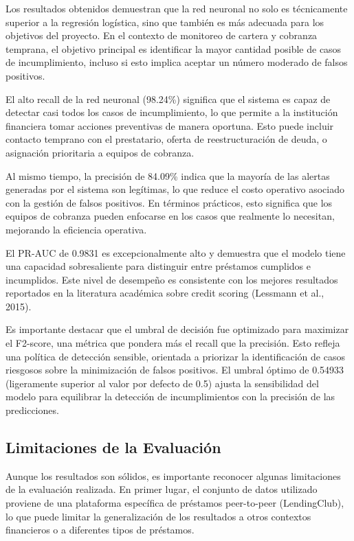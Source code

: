 \documentclass[12pt,a4paper]{article}
\begin{document}
Los resultados obtenidos demuestran que la red neuronal no solo es técnicamente superior a la regresión logística, sino que también es más adecuada para los objetivos del proyecto. En el contexto de monitoreo de cartera y cobranza temprana, el objetivo principal es identificar la mayor cantidad posible de casos de incumplimiento, incluso si esto implica aceptar un número moderado de falsos positivos.

El alto recall de la red neuronal (98.24\%) significa que el sistema es capaz de detectar casi todos los casos de incumplimiento, lo que permite a la institución financiera tomar acciones preventivas de manera oportuna. Esto puede incluir contacto temprano con el prestatario, oferta de reestructuración de deuda, o asignación prioritaria a equipos de cobranza.

Al mismo tiempo, la precisión de 84.09\% indica que la mayoría de las alertas generadas por el sistema son legítimas, lo que reduce el costo operativo asociado con la gestión de falsos positivos. En términos prácticos, esto significa que los equipos de cobranza pueden enfocarse en los casos que realmente lo necesitan, mejorando la eficiencia operativa.

El PR-AUC de 0.9831 es excepcionalmente alto y demuestra que el modelo tiene una capacidad sobresaliente para distinguir entre préstamos cumplidos e incumplidos. Este nivel de desempeño es consistente con los mejores resultados reportados en la literatura académica sobre credit scoring (Lessmann et al., 2015).

Es importante destacar que el umbral de decisión fue optimizado para maximizar el F2-score, una métrica que pondera más el recall que la precisión. Esto refleja una política de detección sensible, orientada a priorizar la identificación de casos riesgosos sobre la minimización de falsos positivos. El umbral óptimo de 0.54933 (ligeramente superior al valor por defecto de 0.5) ajusta la sensibilidad del modelo para equilibrar la detección de incumplimientos con la precisión de las predicciones.

\subsection{Limitaciones de la Evaluación}

Aunque los resultados son sólidos, es importante reconocer algunas limitaciones de la evaluación realizada. En primer lugar, el conjunto de datos utilizado proviene de una plataforma específica de préstamos peer-to-peer (LendingClub), lo que puede limitar la generalización de los resultados a otros contextos financieros o a diferentes tipos de préstamos.
\end{document}
